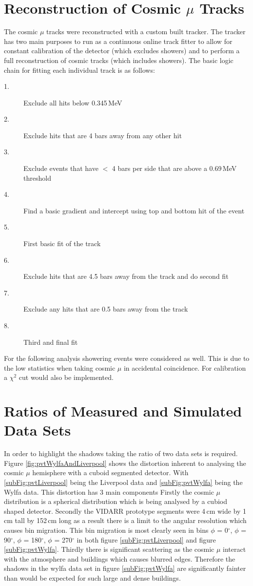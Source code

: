 \documentclass[12pt,a4paper]{article}
\begin{document}
\section{Reconstruction of Cosmic $\mu$ Tracks} \label{sec:ReconstructionOfCosmicMuTracks}
The cosmic $\mu$ tracks were reconstructed with a custom built tracker. The tracker has two main purposes to run as a continuous online track fitter to allow for constant calibration of the detector (which excludes showers) and to perform a full reconstruction of cosmic tracks (which includes showers). The basic logic chain for fitting each individual track is as follows: 
\begin{description}
  \item[1.] Exclude all hits below 0.345\,MeV
  \item[2.] Exclude hits that are 4 bars away from any other hit 
  \item[3.] Exclude events that have $<$ 4 bars per side that are above a 0.69\,MeV threshold
  \item[4.] Find a basic gradient and intercept using top and bottom hit of the event
  \item[5.] First basic fit of the track 
  \item[6.] Exclude hits that are 4.5 bars away from the track and do second fit 
  \item[7.] Exclude any hits that are 0.5 bars away from the track
  \item[8.] Third and final fit 
\end{description}

For the following analysis showering events were considered as well. This is due to the low statistics when taking cosmic $\mu$ in accidental coincidence. For calibration a $\chi^2$ cut would also be implemented. 

\section{Ratios of Measured and Simulated Data Sets} \label{sec:RatiosOfMeasuredAndSimulatedDataSets}
In order to highlight the shadows taking the ratio of two data sets is required. Figure \ref{fig:pvtWylfaAndLiverpool} shows the distortion inherent to analysing the cosmic $\mu$ hemisphere with a cuboid segmented detector. With \ref{subFig:pvtLiverpool} being the Liverpool data and \ref{subFig:pvtWylfa} being the Wylfa data. This distortion has 3 main components Firstly the cosmic $\mu$ distribution is a spherical distribution which is being analysed by a cubiod shaped detector. Secondly the VIDARR prototype segments were 4\,cm wide by 1\,cm tall by 152\,cm long as a result there is a limit to the angular resolution which causes bin migration. This bin migration is most clearly seen in bins $\phi$ = 0$^\circ$, $\phi$ =  90$^\circ$, $\phi$ = 180$^\circ$, $\phi$ = 270$^\circ$ in both figure \ref{subFig:pvtLiverpool} and figure \ref{subFig:pvtWylfa}. Thirdly there is significant scattering as the cosmic $\mu$ interact with the atmosphere and buildings which causes blurred edges. Therefore the shadows in the wylfa data set in figure \ref{subFig:pvtWylfa} are significantly fainter than would be expected for such large and dense buildings.  
\end{document}
